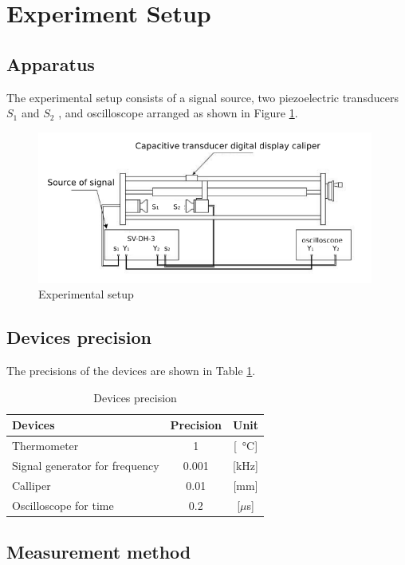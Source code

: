 \section{Experiment Setup}
\subsection{Apparatus}
    The experimental setup consists of a signal source, two piezoelectric transducers $S_1$ and $S_2$ , and oscilloscope arranged as shown in Figure \ref{app}.
    \begin{figure}[h]
        \centering
        \includegraphics[height=5cm]{images/app.png}
        \caption{Experimental setup}\label{app}
    \end{figure}
\subsection{Devices precision}
    The precisions of the devices are shown in Table \ref{precision}.
    \begin{table}
        \centering
        \begin{tabular}{|l|c|c|}
            \hline
            Devices & Precision & Unit\\ \hline
            Thermometer & 1 & [\SI{}{\degreeCelsius}]\\ \hline
            Signal generator for frequency & 0.001 & [kHz]\\ \hline
            Calliper & 0.01 & [mm]\\ \hline
            Oscilloscope for time & 0.2 & [$\mu$s]\\ \hline
        \end{tabular}
        \caption{Devices precision}\label{precision}
    \end{table}

\subsection{Measurement method}
